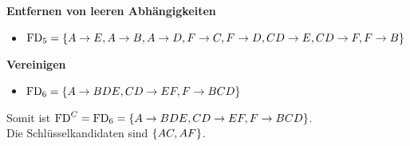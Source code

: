\documentclass[main.tex]{subfiles}
\begin{document}
\textbf{Entfernen von leeren Abhängigkeiten}
\begin{itemize}
    \item $\text{FD}_5= \{A\to E, A\to B, A\to D, F\to C, F\to D, CD\to E, CD\to F, F\to B\}$
\end{itemize}

\textbf{Vereinigen}
\begin{itemize}
    \item $\text{FD}_6 = \{A\to BDE, CD\to EF, F\to BCD\}$
\end{itemize}

Somit ist $\text{FD}^C = \text{FD}_6 = \{A\to BDE, CD\to EF, F\to BCD\}$.\\
Die Schlüsselkandidaten sind $\{AC, AF\}$.
\end{document}

